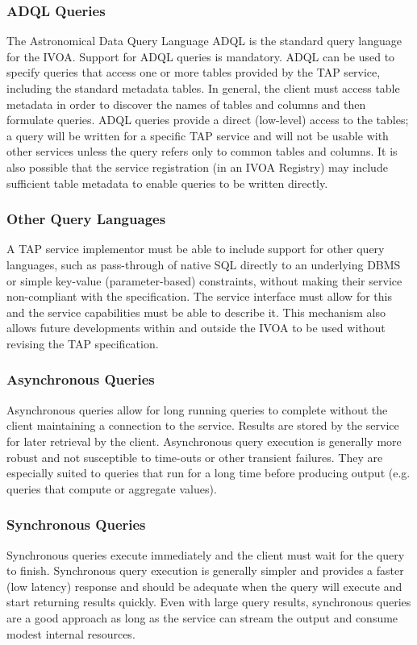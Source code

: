 \documentclass[11pt,letter]{ivoa}
\begin{document}
\subsubsection{ADQL Queries}
The Astronomical Data Query Language ADQL \citep{std:ADQL} is the standard 
query language for the IVOA. Support for ADQL queries is mandatory. ADQL can be 
used to specify queries  that access one or more tables provided by the TAP 
service, including the standard metadata tables. In general, the client must 
access table metadata in order to discover the names of tables and columns and 
then formulate queries. ADQL queries provide a direct (low-level) access to the 
tables; a query will be written for a specific TAP service and will not be 
usable with other services unless the query refers only to common tables and 
columns. It is also possible that the service registration (in an IVOA Registry) 
may include sufficient table metadata to enable queries to be written directly.

\subsubsection{Other Query Languages}
A TAP service implementor must be able to include support for other query languages, such as
pass-through of native SQL directly to an underlying DBMS or simple key-value 
(parameter-based) constraints, without making their service non-compliant with the specification. The service interface must allow for 
this and the service capabilities must be able to describe it. This mechanism 
also allows future developments within and outside the IVOA to be used without 
revising the TAP specification.

\subsubsection{Asynchronous Queries}
Asynchronous queries allow for long running queries to complete without 
the client maintaining a connection to the service. Results are stored by 
the service for later retrieval by the client. Asynchronous query 
execution is generally more robust and not susceptible to time-outs or other 
transient failures. They are especially suited to queries that run for a long 
time before producing output (e.g. queries that compute or aggregate values).

\subsubsection{Synchronous Queries}
Synchronous queries execute immediately  and the client must wait for the query 
to finish. Synchronous query execution is generally simpler and provides a 
faster (low latency) response and should be adequate when the query will execute 
and start returning results quickly. Even with large query results, synchronous 
queries are a good approach as long as the service can stream the output 
and consume modest internal resources. 
\end{document}
